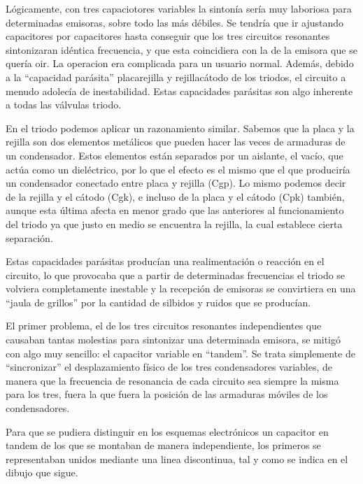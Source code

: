 \documentclass[letterpaper,10pt,spanish]{sphinxmanual}
\let\sphinxpxdimen\pdfpxdimen\else\newdimen\sphinxpxdimen
\begin{document}
Lógicamente, con tres capaciotores variables la sintonía sería muy laboriosa para determinadas emisoras, sobre todo las más débiles. Se tendría que ir ajustando capacitores por capacitores hasta conseguir que los tres circuitos resonantes sintonizaran idéntica frecuencia, y que esta coincidiera con la de la emisora que se quería oir. La operacion era complicada para un usuario normal. Además, debido a la “capacidad parásita” placa\sphinxhyphen{}rejilla y rejilla\sphinxhyphen{}cátodo de los triodos, el circuito a menudo
adolecía de inestabilidad. Estas capacidades parásitas son algo inherente a todas las válvulas triodo.

En el triodo podemos aplicar un razonamiento similar. Sabemos que la placa y la rejilla son dos elementos metálicos que pueden hacer las veces de armaduras de un condensador. Estos elementos están separados por un aislante, el vacío, que actúa como un dieléctrico, por lo que el efecto es el mismo que el que produciría un condensador conectado entre placa y rejilla (Cgp). Lo mismo podemos decir de la rejilla y el cátodo (Cgk), e incluso de la placa y el cátodo (Cpk) también, aunque esta última
afecta en menor grado que las anteriores al funcionamiento del triodo ya que justo en medio se encuentra la rejilla, la cual establece cierta separación.

Estas capacidades parásitas producían una realimentación o reacción en el circuito, lo que provocaba que a partir de determinadas frecuencias el triodo se volviera completamente inestable y la recepción de emisoras se convirtiera en una “jaula de grillos” por la cantidad de silbidos y ruidos que se producían.

El primer problema, el de los tres circuitos resonantes independientes que causaban tantas molestias para sintonizar una determinada emisora, se mitigó con algo muy sencillo: el capacitor variable en “tandem”. Se trata simplemente de “sincronizar” el desplazamiento físico de los tres condensadores variables, de manera que la frecuencia de resonancia de cada circuito sea siempre la misma para los tres, fuera la que fuera la posición de las armaduras móviles de los condensadores.

Para que se pudiera distinguir en los esquemas electrónicos un capacitor en tandem de los que se montaban de manera independiente, los primeros se representaban unidos mediante una linea discontinua, tal y como se indica en el dibujo que sigue.

\sphinxincludegraphics[width=588\sphinxpxdimen,height=213\sphinxpxdimen]{{receprfs2low}.png}
\end{document}
